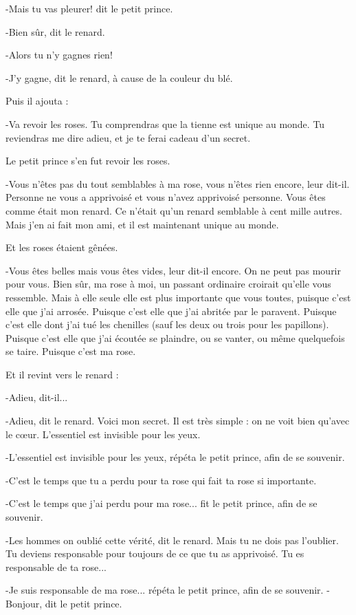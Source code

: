 \documentclass{report}
\begin{document}
-Mais tu vas pleurer! dit le petit prince.

-Bien sûr, dit le renard.

-Alors tu n'y gagnes rien!

-J'y gagne, dit le renard, à cause de la couleur du blé.

Puis il ajouta :

-Va revoir les roses. Tu comprendras que la tienne est unique au monde. Tu reviendras me dire adieu, et je te ferai cadeau d'un secret.

Le petit prince s'en fut revoir les roses.

-Vous n'êtes pas du tout semblables à ma rose, vous n'êtes rien encore, leur dit-il. Personne ne vous a apprivoisé et vous n'avez apprivoisé personne. Vous êtes comme était mon renard. Ce n'était qu'un renard semblable à cent mille autres. Mais j'en ai fait mon ami, et il est maintenant unique au monde.

Et les roses étaient gênées.

-Vous êtes belles mais vous êtes vides, leur dit-il encore. On ne peut pas mourir pour vous. Bien sûr, ma rose à moi, un passant ordinaire croirait qu'elle vous ressemble. Mais à elle seule elle est plus importante que vous toutes, puisque c'est elle que j'ai arrosée. Puisque c'est elle que j'ai abritée par le paravent. Puisque c'est elle dont j'ai tué les chenilles (sauf les deux ou trois pour les papillons). Puisque c'est elle que j'ai écoutée se plaindre, ou se vanter, ou même quelquefois se taire. Puisque c'est ma rose.

Et il revint vers le renard :

-Adieu, dit-il...

-Adieu, dit le renard. Voici mon secret. Il est très simple : on ne voit bien qu'avec le cœur. L'essentiel est invisible pour les yeux.

-L'essentiel est invisible pour les yeux, répéta le petit prince, afin de se souvenir.

-C'est le temps que tu a perdu pour ta rose qui fait ta rose si importante.

-C'est le temps que j'ai perdu pour ma rose... fit le petit prince, afin de se souvenir.

-Les hommes on oublié cette vérité, dit le renard. Mais tu ne dois pas l'oublier. Tu deviens responsable pour toujours de ce que tu as apprivoisé. Tu es responsable de ta rose...

-Je suis responsable de ma rose... répéta le petit prince, afin de se souvenir.
\parachapter{} %
-Bonjour, dit le petit prince.
\end{document}
